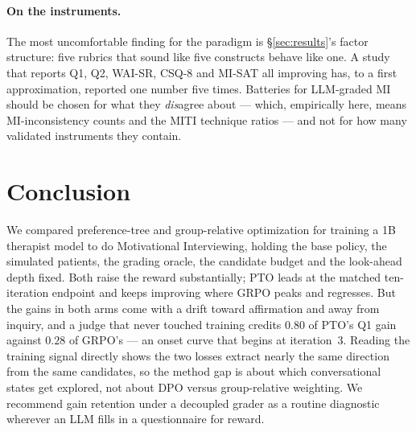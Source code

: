\paragraph{On the instruments.}
The most uncomfortable finding for the paradigm is \S\ref{sec:results}'s factor structure:
five rubrics that sound like five constructs behave like one. A study that reports Q1, Q2,
WAI-SR, CSQ-8 and MI-SAT all improving has, to a first approximation, reported one number
five times. Batteries for LLM-graded MI should be chosen for what they \emph{dis}agree
about --- which, empirically here, means MI-inconsistency counts and the MITI technique
ratios --- and not for how many validated instruments they contain.

\section{Conclusion}
\label{sec:conclusion}

We compared preference-tree and group-relative optimization for training a 1B therapist
model to do Motivational Interviewing, holding the base policy, the simulated patients, the
grading oracle, the candidate budget and the look-ahead depth fixed. Both raise the reward
substantially; PTO leads at the matched ten-iteration endpoint and keeps improving where
GRPO peaks and regresses. But the gains in both arms come with a drift toward affirmation
and away from inquiry, and a judge that never touched training credits $0.80$ of PTO's Q1
gain against $0.28$ of GRPO's --- an onset curve that begins at iteration~3. Reading the
training signal directly shows the two losses extract nearly the same direction from the
same candidates, so the method gap is about which conversational states get explored, not
about DPO versus group-relative weighting. We recommend gain retention under a decoupled
grader as a routine diagnostic wherever an LLM fills in a questionnaire for reward.
